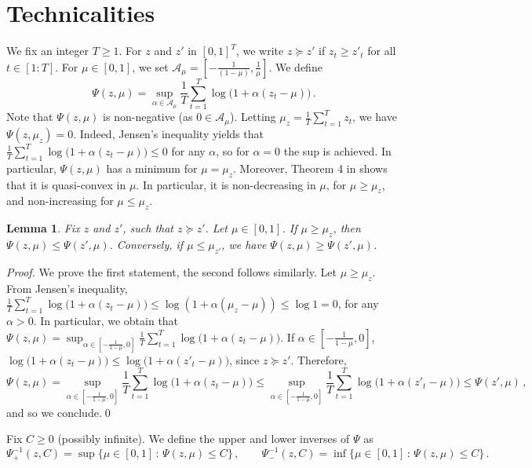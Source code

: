 \documentclass[3p, authoryear, 10pt]{elsarticle}%
\newtheorem{lemma}{Lemma}
\newcommand{\A}{\mathcal A}
\begin{document}
\section{Technicalities}
We fix an integer $T\geq 1$. For $z$ and $z'$ in $[0,1]^T$, we write $z\succeq z'$ if $z_t\geq z'_t$ for all $t\in[1:T]$. For $\mu\in[0,1]$, we set $\A_\mu = [-\tfrac{1}{(1-\mu)},\tfrac1\mu]$. We define
$$\Psi(z,\mu) = \sup_{\alpha\in \A_\mu}\frac1T\sum_{t=1}^{T}\log\big(1+\alpha(z_t-\mu)\big)\,.$$
Note that $\Psi(z,\mu)$ is non-negative (as $0\in \A_\mu$). Letting $\mu_z=\frac{1}{T}\sum_{t=1}^{T}z_t$, we have $\Psi(z,\mu_z) = 0$. Indeed, Jensen's inequality yields that $\frac1T\sum_{t=1}^{T}\log\big(1+\alpha(z_t-\mu)\big)\leq 0$ for any $\alpha$, so for $\alpha=0$ the sup is achieved. In particular, $\Psi(z,\mu)$ has a minimum for $\mu=\mu_z$. Moreover, Theorem 4 in \cite{orabona2023tight} shows that it is quasi-convex in $\mu$. In particular, it is non-decreasing in $\mu$, for $\mu\geq\mu_z$, and non-increasing for $\mu\leq\mu_z$. 


\begin{lemma}\label{lemma:Psi}
    Fix $z$ and $z'$, such that $z\succeq z'$.  Let $\mu\in [0,1]$. If $\mu\geq\mu_z$, then
    $\Psi(z,\mu)\leq\Psi(z',\mu)$.
    Conversely, if $\mu\leq\mu_{z'}$, we have $\Psi(z,\mu)\geq\Psi(z',\mu)$.
\end{lemma}
\begin{proof}
    We prove the first statement, the second follows similarly. Let $\mu\geq\mu_z$. From Jensen's inequality, $\frac1T\sum_{t=1}^{T}\log\big(1+\alpha(z_t-\mu)\big)\leq \log\left(1+\alpha (\mu_z-\mu)\right)\leq\log 1 = 0$,
    for any $\alpha>0$. In particular, we obtain that
    $\Psi(z,\mu) = \sup_{\alpha\in[-\frac{1}{1-\mu},0]}\frac1T\sum_{t=1}^{T}\log\big(1+\alpha(z_t-\mu)\big)$. If $\alpha\in[-\frac{1}{1-\mu},0]$, $\log\big(1+\alpha(z_t-\mu)\big)\leq\log\big(1+\alpha(z'_t-\mu)\big)$, since $z\succeq z'$. Therefore,
    $$\Psi(z,\mu) = \sup_{\alpha\in[-\frac{1}{1-\mu},0]}\frac1T\sum_{t=1}^{T}\log\big(1+\alpha(z_t-\mu)\big)\leq \sup_{\alpha\in[-\frac{1}{1-\mu},0]}\frac1T\sum_{t=1}^{T}\log\big(1+\alpha(z'_t-\mu)\big)\leq\Psi(z',\mu)\,,$$ and so we conclude.\qed
\end{proof}

Fix $C\geq 0$ (possibly infinite). We define the upper and lower inverses of $\Psi$ as $$\Psi^{-1}_+(z,C) = \sup\big\{\mu\in[0,1]\,:\,\Psi(z,\mu)\leq C\big\}\,,\qquad\Psi^{-1}_-(z,C) = \inf\big\{\mu\in[0,1]\,:\,\Psi(z,\mu)\leq C\big\}\,.$$
\end{document}
